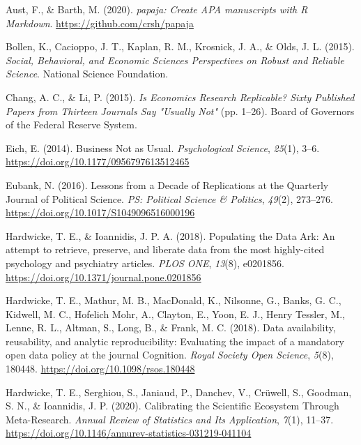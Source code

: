 \documentclass[english,,man,floatsintext]{apa6}
\begin{document}
\hypertarget{refs}{}
\leavevmode\hypertarget{ref-R-papaja}{}%
Aust, F., \& Barth, M. (2020). \emph{papaja: Create APA manuscripts with R Markdown}. \url{https://github.com/crsh/papaja}

\leavevmode\hypertarget{ref-bollen2015}{}%
Bollen, K., Cacioppo, J. T., Kaplan, R. M., Krosnick, J. A., \& Olds, J. L. (2015). \emph{Social, Behavioral, and Economic Sciences Perspectives on Robust and Reliable Science}. National Science Foundation.

\leavevmode\hypertarget{ref-chang2015}{}%
Chang, A. C., \& Li, P. (2015). \emph{Is Economics Research Replicable? Sixty Published Papers from Thirteen Journals Say "Usually Not"} (pp. 1--26). Board of Governors of the Federal Reserve System.

\leavevmode\hypertarget{ref-eich2014}{}%
Eich, E. (2014). Business Not as Usual. \emph{Psychological Science}, \emph{25}(1), 3--6. \url{https://doi.org/10.1177/0956797613512465}

\leavevmode\hypertarget{ref-eubank2016}{}%
Eubank, N. (2016). Lessons from a Decade of Replications at the Quarterly Journal of Political Science. \emph{PS: Political Science \& Politics}, \emph{49}(2), 273--276. \url{https://doi.org/10.1017/S1049096516000196}

\leavevmode\hypertarget{ref-hardwicke2018}{}%
Hardwicke, T. E., \& Ioannidis, J. P. A. (2018). Populating the Data Ark: An attempt to retrieve, preserve, and liberate data from the most highly-cited psychology and psychiatry articles. \emph{PLOS ONE}, \emph{13}(8), e0201856. \url{https://doi.org/10.1371/journal.pone.0201856}

\leavevmode\hypertarget{ref-hardwicke2018a}{}%
Hardwicke, T. E., Mathur, M. B., MacDonald, K., Nilsonne, G., Banks, G. C., Kidwell, M. C., Hofelich Mohr, A., Clayton, E., Yoon, E. J., Henry Tessler, M., Lenne, R. L., Altman, S., Long, B., \& Frank, M. C. (2018). Data availability, reusability, and analytic reproducibility: Evaluating the impact of a mandatory open data policy at the journal Cognition. \emph{Royal Society Open Science}, \emph{5}(8), 180448. \url{https://doi.org/10.1098/rsos.180448}

\leavevmode\hypertarget{ref-hardwicke2020b}{}%
Hardwicke, T. E., Serghiou, S., Janiaud, P., Danchev, V., Crüwell, S., Goodman, S. N., \& Ioannidis, J. P. (2020). Calibrating the Scientific Ecosystem Through Meta-Research. \emph{Annual Review of Statistics and Its Application}, \emph{7}(1), 11--37. \url{https://doi.org/10.1146/annurev-statistics-031219-041104}
\end{document}
